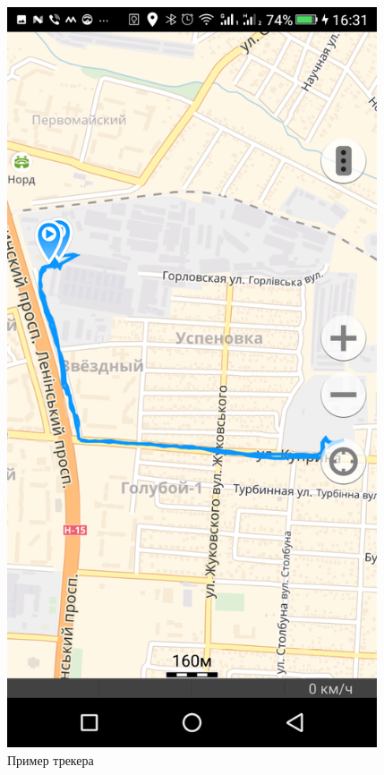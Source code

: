 \documentclass[a4paper,12pt]{article}
\begin{document}
\begin{figure}
	\centering
	\includegraphics[width=10.94cm]{images/example.png}
	\caption{Пример трекера}
	\label{fig:card}
\end{figure}



\pagebreak

\end{document}
